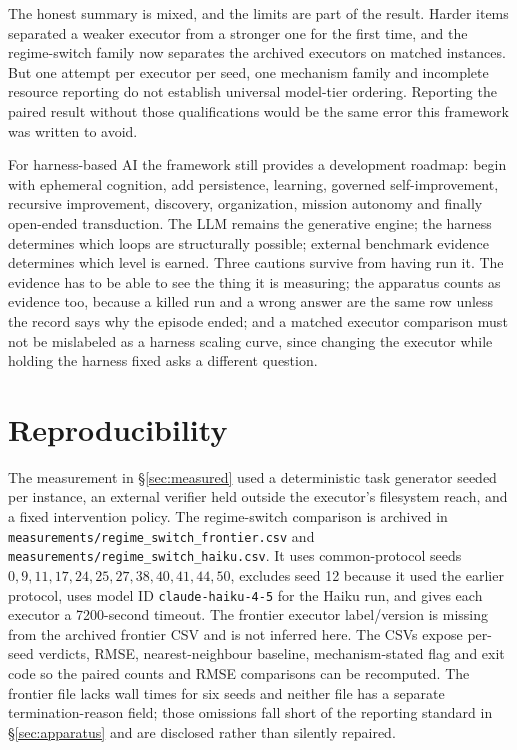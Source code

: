 \documentclass[11pt]{article}
\theoremstyle{definition}
\begin{document}
The honest summary is mixed, and the limits are part of the result. Harder items separated a weaker executor from a stronger one for the first time, and the regime-switch family now separates the archived executors on matched instances. But one attempt per executor per seed, one mechanism family and incomplete resource reporting do not establish universal model-tier ordering. Reporting the paired result without those qualifications would be the same error this framework was written to avoid.

For harness-based AI the framework still provides a development roadmap: begin with ephemeral cognition, add persistence, learning, governed self-improvement, recursive improvement, discovery, organization, mission autonomy and finally open-ended transduction. The LLM remains the generative engine; the harness determines which loops are structurally possible; external benchmark evidence determines which level is earned. Three cautions survive from having run it. The evidence has to be able to see the thing it is measuring; the apparatus counts as evidence too, because a killed run and a wrong answer are the same row unless the record says why the episode ended; and a matched executor comparison must not be mislabeled as a harness scaling curve, since changing the executor while holding the harness fixed asks a different question.

\section*{Reproducibility}

The measurement in \S\ref{sec:measured} used a deterministic task generator seeded per instance, an external verifier held outside the executor's filesystem reach, and a fixed intervention policy. The regime-switch comparison is archived in \texttt{measurements/regime\_switch\_frontier.csv} and \texttt{measurements/regime\_switch\_haiku.csv}. It uses common-protocol seeds $0,9,11,17,24,25,27,38,40,41,44,50$, excludes seed 12 because it used the earlier protocol, uses model ID \texttt{claude-haiku-4-5} for the Haiku run, and gives each executor a 7200-second timeout. The frontier executor label/version is missing from the archived frontier CSV and is not inferred here. The CSVs expose per-seed verdicts, RMSE, nearest-neighbour baseline, mechanism-stated flag and exit code so the paired counts and RMSE comparisons can be recomputed. The frontier file lacks wall times for six seeds and neither file has a separate termination-reason field; those omissions fall short of the reporting standard in \S\ref{sec:apparatus} and are disclosed rather than silently repaired.
\end{document}
